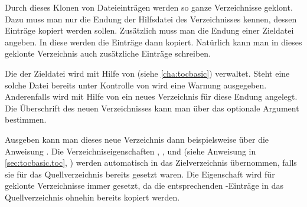 \begin{Declaration}
\end{Declaration}%
Durch dieses Klonen von Dateieinträgen werden so ganze Verzeichnisse
geklont. Dazu muss man nur die Endung der Hilfsdatei des Verzeichnisses
kennen, dessen Einträge kopiert werden sollen. Zusätzlich muss man die Endung
einer Zieldatei angeben. In diese werden die Einträge dann kopiert. Natürlich
kann man in dieses geklonte Verzeichnis auch zusätzliche Einträge
schreiben.

Die  der Zieldatei wird mit Hilfe von
\hyperref[cha:tocbasic]{}%
 (siehe
\autoref{cha:tocbasic}) verwaltet. Steht eine solche Datei bereits unter
Kontrolle von \hyperref[cha:tocbasic]{} wird eine Warnung
ausgegeben. Anderenfalls wird mit Hilfe von
\hyperref[cha:tocbasic]{} ein neues Verzeichnis für diese
Endung angelegt. Die Überschrift des neuen Verzeichnisses kann man über das
optionale Argument  bestimmen.

Ausgeben kann man dieses neue Verzeichnis dann beispielsweise über die
Anweisung . Die
Verzeichniseigenschaften
, ,  und 
(siehe Anweisung  in
\autoref{sec:tocbasic.toc}, ) werden
automatisch in das Zielverzeichnis übernommen, falls sie für das
Quellverzeichnis bereits gesetzt waren. Die Eigenschaft  wird
für geklonte Verzeichnisse immer gesetzt, da die entsprechenden
-Einträge in das Quellverzeichnis ohnehin bereits kopiert
werden.

